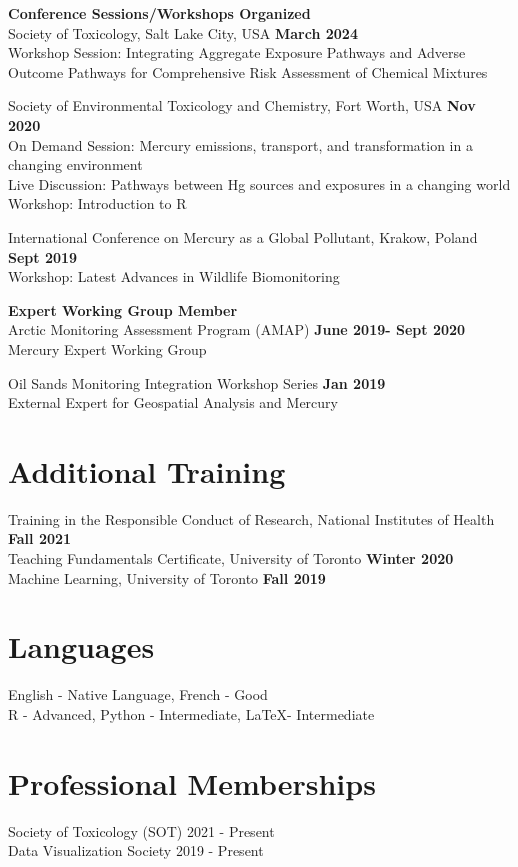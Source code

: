 \documentclass[margin,line]{res}
\begin{document}
\begin{resume}
{\bf Conference Sessions/Workshops Organized}\\
Society of Toxicology, Salt Lake City, USA \hfill {\bf  March 2024}\\
Workshop Session: Integrating Aggregate Exposure Pathways and Adverse Outcome Pathways for Comprehensive Risk Assessment of Chemical Mixtures

Society of Environmental Toxicology and Chemistry, Fort Worth, USA \hfill {\bf  Nov 2020}\\
On Demand Session: Mercury emissions, transport, and transformation in a changing environment\\
Live Discussion: Pathways between Hg sources and exposures in a changing world\\
Workshop: Introduction to R

International Conference on Mercury as a Global Pollutant, Krakow, Poland \hfill {\bf Sept 2019}\\
Workshop: Latest Advances in Wildlife Biomonitoring

{\bf Expert Working Group Member}\\
Arctic Monitoring Assessment Program (AMAP)
\hfill {\bf  June 2019- Sept 2020}\\
Mercury Expert Working Group

Oil Sands Monitoring Integration Workshop Series
\hfill {\bf  Jan 2019}\\
External Expert for Geospatial Analysis and Mercury

\vspace*{.1in}

\section{\sc Additional Training}
Training in the Responsible Conduct of Research, National Institutes of Health \hfill {\bf  Fall 2021}\\
Teaching Fundamentals Certificate, University of Toronto
\hfill {\bf  Winter 2020}\\
Machine Learning, University of Toronto
\hfill {\bf  Fall 2019}

\vspace*{.1in}

\section{\sc Languages}

English - Native Language, French - Good\\
R - Advanced, Python - Intermediate, LaTeX- Intermediate

\vspace*{.1in}

\section{\sc Professional Memberships}
Society of Toxicology (SOT) 2021 - Present \\
Data Visualization Society 2019 - Present\\


\end{resume}
\end{document}
